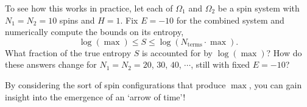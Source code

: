 \documentclass[12 pt]{article} %
\newcommand{\Om}{\ensuremath{\Omega} }
\begin{document}
To see how this works in practice, let each of $\Om_1$ and $\Om_2$ be a spin system with $N_1 = N_2 = 10$ spins and $H = 1$.
Fix $E = -10$ for the combined system and numerically compute the bounds on its entropy,
\begin{equation*}
  \log\left(\max\right) \leq S \leq \log\left(N_{\text{terms}} \cdot \max\right).
\end{equation*}
What fraction of the true entropy $S$ is accounted for by $\log\left(\max\right)$?
How do these answers change for $N_1 = N_2 = 20$, $30$, $40$, $\cdots$, still with fixed $E = -10$?

By considering the sort of spin configurations that produce $\max$, you can gain insight into the emergence of an `arrow of time'!
\end{document}
